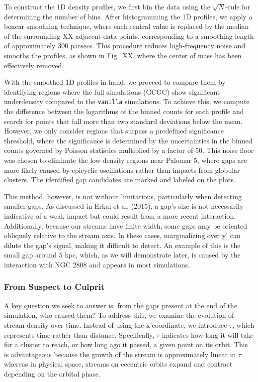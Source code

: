 \documentclass[]{aa}
\begin{document}
      To construct the 1D density profiles, we first bin the data using the  $\sqrt{N}$-rule for determining the number of bins. After histogramming the 1D profiles, we apply a boxcar smoothing technique, where each central value is replaced by the median of the surrounding XX adjacent data points, corresponding to a smoothing length of approximately 300 parsecs. This procedure reduces high-frequency noise and smooths the profiles, as shown in Fig.~XX, where the center of mass has been effectively removed.

      With the smoothed 1D profiles in hand, we proceed to compare them by identifying regions where the full simulations (GCGC) show significant underdensity compared to the \texttt{vanilla} simulations. To achieve this, we compute the difference between the logarithms of the binned counts for each profile and search for points that fall more than two standard deviations below the mean. However, we only consider regions that surpass a predefined significance threshold, where the significance is determined by the uncertainties in the binned counts governed by Poisson statistics multiplied by a factor of 50. This noise floor was chosen to eliminate the low-density regions near Palomar 5, where gaps are more likely caused by epicyclic oscillations rather than impacts from globular clusters. The identified gap candidates are marked and labeled on the plots.

      This method, however, is not without limitations, particularly when detecting smaller gaps. As discussed in Erkal et al. (2015), a gap's size is not necessarily indicative of a weak impact but could result from a more recent interaction. Additionally, because our streams have finite width, some gaps may be oriented obliquely relative to the stream axis. In these cases, marginalizing over y' can dilute the gap's signal, making it difficult to detect. An example of this is the small gap around 5 kpc, which, as we will demonstrate later, is caused by the interaction with NGC 2808 and appears in most simulations. 


    \subsubsection*{From Suspect to Culprit} \label{SuspectToCulprit}

      A key question we seek to answer is: from the gaps present at the end of the simulation, who caused them? To address this, we examine the evolution of stream density over time. Instead of using the x'coordinate, we introduce $\tau$, which represents time rather than distance. Specifically, $\tau$ indicates how long it will take for a cluster to reach, or how long ago it passed, a given point on its orbit. This is advantageous because the growth of the stream is approximately linear in $\tau$ whereas in physical space, streams on eccentric orbits expand and contract depending on the orbital phase.
\end{document}
